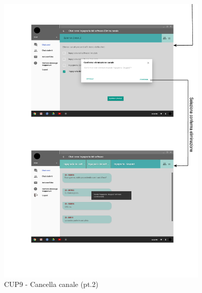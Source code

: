 \begin{figure}
	\centering
	\includegraphics[width=0.9\textwidth]{imgs/gruppo6/activities/act_cup9_cancella_canale2.pdf}
	\caption{CUP9 - Cancella canale (pt.2)}
	\label{fig:act-cup9-2}
\end{figure}

